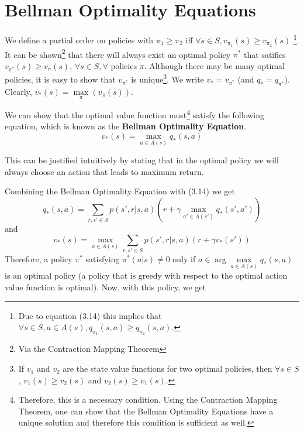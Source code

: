 \documentclass[12pt]{report}
\begin{document}
\section{Bellman Optimality Equations}
We define a partial order on policies with $\pi_{1} \geq \pi_{2}$ iff $\forall s \in S, v_{\pi_{1}}(s) \geq v_{\pi_{2}}(s)$ \footnote{Due to equation (3.14) this implies that $\forall s \in S, a \in A(s), q_{\pi_{1}}(s, a) \geq q_{\pi_{2}}(s, a)$.}.
It can be shown\footnote{Via the Contraction Mapping Theorem} that there will always exist an optimal policy $\pi^{*}$ that satifies $v_{\pi^{*}}(s) \geq v_{\pi}(s)$, $\forall s \in S, \forall \text{ policies } \pi$. Although there may be many optimal policies, it is easy to show that $v_{\pi^{*}}$ is unique\footnote{If $v_{1}$ and $v_{2}$ are the state value functions for two optimal policies, then $\forall s \in S$, $v_{1}(s) \geq v_{2}(s)$ and $v_{2}(s) \geq v_{1}(s)$.}. We write $v_{*} = v_{\pi^{*}}$ (and $q_{*} = q_{\pi^{*}}$).
Clearly, $v_{*}(s) = \max\limits_{\pi}(v_{\pi}(s))$.

We can show that the optimal value function must\footnote{Therefore, this is a necessary condition. Using the Contraction Mapping Theorem, one can show that the Bellman Optimality Equations have a unique solution and therefore this condition is sufficient as well.} satisfy the following equation, which is known as the \textbf{Bellman Optimality Equation}.
\begin{equation}
    v_{*}(s) = \max_{a \in A(s)} q_{*}(s, a)
\end{equation}

This can be justified intuitively by stating that in the optimal policy we will always choose an action that leads to maximum return.

Combining the Bellman Optimality Equation with (3.14) we get
\begin{equation}
    q_{*}(s, a) = \sum_{r, s' \in S} p(s', r | s, a)(r + \gamma \max_{a' \in A(s')} q_{*}(s', a'))
\end{equation}
and
\begin{equation}
    v_{*}(s) =  \max_{a \in A(s)} \sum_{r, s' \in S} p(s', r | s, a)(r + \gamma v_{*}(s'))
\end{equation}
Therefore, a policy $\pi^{*}$ satisfying $\pi^{*}(a | s) \neq 0$ only if $a \in \arg\max\limits_{a \in A(s)} q_{*}(s, a)$ is an optimal policy (a policy that is greedy with respect to the optimal action value function is optimal). Now, with this policy, we get
\end{document}
